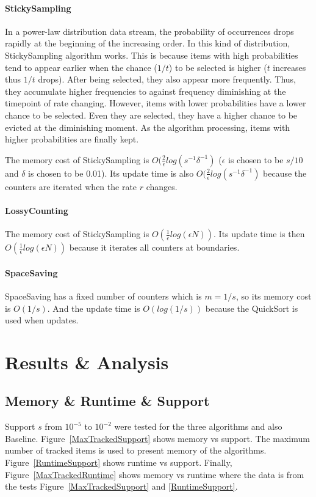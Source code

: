 \documentclass[10pt]{article}
\begin{document}
\paragraph{StickySampling}
In a power-law distribution data stream, the probability of occurrences drops rapidly at the beginning of the increasing order. In this kind of distribution, StickySampling algorithm works. 
This is because items with high probabilities tend to appear earlier when the chance ($1/t$) to be selected is higher ($t$ increases thus $1/t$ drops).
After being selected, they also appear more frequently. Thus, they accumulate higher frequencies to against frequency diminishing at the timepoint of rate changing.
However, items with lower probabilities have a lower chance to be selected. 
Even they are selected, they have a higher chance to be evicted at the diminishing moment.
As the algorithm processing, items with higher probabilities are finally kept.

The memory cost of StickySampling is $O(\frac{2}{\epsilon}log(s^{-1}\delta^{-1})$ \cite{stickylossy}
($\epsilon{}$ is chosen to be $s/10$ and $\delta{}$ is chosen to be 0.01).
Its update time is also $O(\frac{2}{\epsilon}log(s^{-1}\delta^{-1})$ because the counters are iterated when the rate $r$ changes.
\paragraph{LossyCounting}
The memory cost of StickySampling is $O(\frac{1}{\epsilon}log(\epsilon{}N))$. 
Its update time is then $O(\frac{1}{\epsilon}log(\epsilon{}N))$ because it iterates all counters at boundaries.
\paragraph{SpaceSaving}
SpaceSaving has a fixed number of counters which is $m = 1/s$, so its memory cost is $O(1/s)$. 
And the update time is $O(log(1/s))$ because the QuickSort is used when updates.

\section{Results \& Analysis} \label{resultsanalysis}

\subsection{Memory \& Runtime \& Support}
Support $s$ from $10^{-5}$ to $10^{-2}$ were tested for the three algorithms and also Baseline.
Figure~\ref{MaxTrackedSupport} shows memory vs support. 
The maximum number of tracked items is used to present memory of the algorithms.
Figure~\ref{RuntimeSupport} shows runtime vs support.
Finally, Figure~\ref{MaxTrackedRuntime} shows memory vs runtime 
where the data is from the tests Figure~\ref{MaxTrackedSupport} and \ref{RuntimeSupport}.
\end{document}
